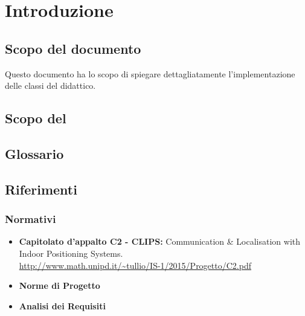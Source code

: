 \section{Introduzione}
\label{introduzione}
\subsection{Scopo del documento} 
Questo documento ha lo scopo di spiegare dettagliatamente l'implementazione delle classi del  didattico. 
\subsection{Scopo del }
\SCOPO
\subsection{Glossario}
\GLOSSARIO
\subsection{Riferimenti}
\subsubsection{Normativi}
\begin{itemize}
	\item \textbf{Capitolato d'appalto C2 - CLIPS:} Communication \& Localisation with Indoor Positioning Systems. \\
	\url{http://www.math.unipd.it/~tullio/IS-1/2015/Progetto/C2.pdf}
	\item \textbf{Norme di Progetto} \\ \NPdoc
	\item \textbf{Analisi dei Requisiti} \\ \ARdoc
\end{itemize}	

